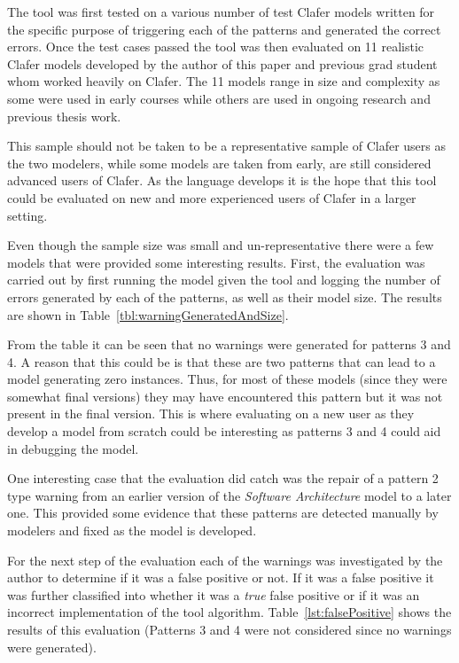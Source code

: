 \documentclass[10pt,oneside]{IEEEtran}
\begin{document}
The tool was first tested on a various number of test Clafer models written for the specific purpose of triggering each of the patterns and generated the correct errors. Once the test cases passed the tool was then evaluated on 11 realistic Clafer models developed by the author of this paper and previous grad student whom worked heavily on Clafer. The 11 models range in size and complexity as some were used in early courses while others are used in ongoing research and previous thesis work.

This sample should not be taken to be a representative sample of Clafer users as the two modelers, while some models are taken from early, are still considered advanced users of Clafer. As the language develops it is the hope that this tool could be evaluated on new and more experienced users of Clafer in a larger setting.

Even though the sample size was small and un-representative there were a few models that were provided some interesting results. First, the evaluation was carried out by first running the model given the tool and logging the number of errors generated by each of the patterns, as well as their model size. The results are shown in Table~\ref{tbl:warningGeneratedAndSize}.

From the table it can be seen that no warnings were generated for patterns 3 and 4. A reason that this could be is that these are two patterns that can lead to a model generating zero instances. Thus, for most of these models (since they were somewhat final versions) they may have encountered this pattern but it was not present in the final version. This is where evaluating on a new user as they develop a model from scratch could be interesting as patterns 3 and 4 could aid in debugging the model.

One interesting case that the evaluation did catch was the repair of a pattern 2 type warning from an earlier version of the \textit{Software Architecture} model to a later one. This provided some evidence that these patterns are detected manually by modelers and fixed as the model is developed.

For the next step of the evaluation each of the warnings was investigated by the author to determine if it was a false positive or not. If it was a false positive it was further classified into whether it was a \textit{true} false positive or if it was an incorrect implementation of the tool algorithm. Table~\ref{lst:falsePositive} shows the results of this evaluation (Patterns 3 and 4 were not considered since no warnings were generated).
\end{document}
